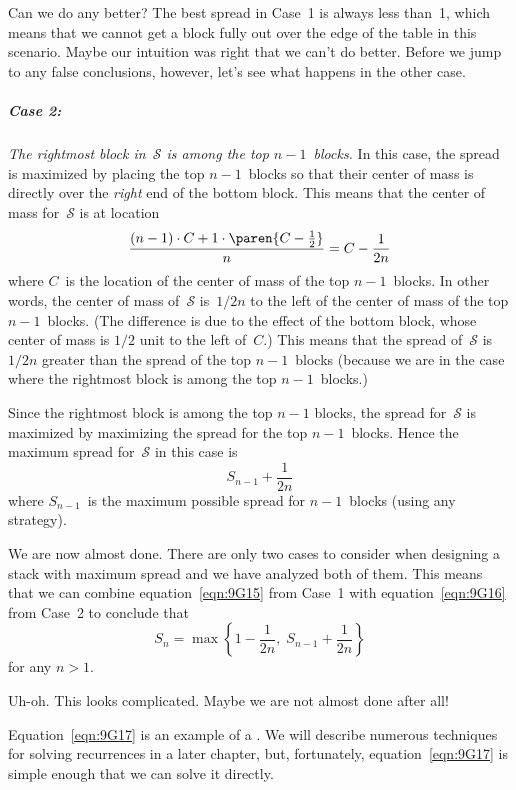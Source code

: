 Can we do any better?  The best spread in Case~1 is always less
than~1, which means that we cannot get a block fully out over the edge
of the table in this scenario.  Maybe our intuition was right that we
can't do better.  Before we jump to any false conclusions, however,
let's see what happens in the other case.

\subparagraph{Case 2:}

\emph{The rightmost block in~$\mathcal{S}$ is among the top $n -
  1$~blocks.}  In this case, the spread is maximized by placing the
top $n - 1$~blocks so that their center of mass is directly over the
\emph{right} end of the bottom block.  This means that the center of
mass for~$\mathcal{S}$ is at location
\[
    \frac{(n - 1) \cdot C + 1 \cdot \paren{C - \frac{1}{2}}}{n}
    = C - \frac{1}{2n}
\]
where $C$~is the location of the center of mass of the top $n -
1$~blocks.  In other words, the center of mass of~$\mathcal{S}$
is~$1/2n$ to the left of the center of mass of the top $n - 1$~blocks.
(The difference is due to the effect of the bottom block, whose center
of mass is $1/2$ unit to the left of~$C$.)  This means that the spread
of~$\mathcal{S}$ is $1/2n$ greater than the spread of the top $n -
1$~blocks (because we are in the case where the rightmost block is
among the top $n - 1$~blocks.)

Since the rightmost block is among the top $n - 1$ blocks, the spread
for~$\mathcal{S}$ is maximized by maximizing the spread for the top $n
- 1$~blocks.  Hence the maximum spread for~$\mathcal{S}$ in this case
is
\begin{equation}\label{eqn:9G16}
    S_{n - 1} + \frac{1}{2n}
\end{equation}
where $S_{n - 1}$~is the maximum possible spread for $n - 1$~blocks
(using any strategy).

We are now almost done.  There are only two cases to consider when
designing a stack with maximum spread and we have analyzed both of
them.  This means that we can combine equation~\ref{eqn:9G15} from
Case~1 with equation~\ref{eqn:9G16} from Case~2 to conclude that
\begin{equation}\label{eqn:9G17}
    S_n = \max \left\{ 1 - \frac{1}{2n}, \; S_{n - 1} + \frac{1}{2n} \right\}
\end{equation}
for any $n > 1$.

Uh-oh. This looks complicated.  Maybe we are not almost done after
all!

Equation~\ref{eqn:9G17} is an example of a .  We will
describe numerous techniques for solving recurrences in a later chapter,
but, fortunately, equation~\ref{eqn:9G17} is simple enough that we can
solve it directly.
\iffalse
without waiting for all the hardware in
Chapter~\ref{chap:recurrences}.
\fi

